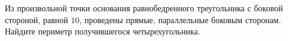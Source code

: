 \begin{ex}
	\begin{condition}
		Из произвольной точки основания равнобедренного треугольника с боковой стороной, равной \( 10 \), проведены прямые, параллельные боковым сторонам. Найдите периметр получившегося четырехугольника. 
	\end{condition}
\end{ex}
